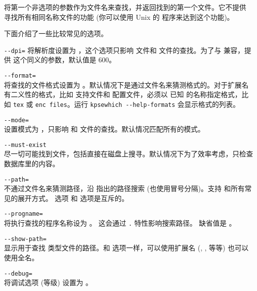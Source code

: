 \documentclass{article}
\begin{document}
\KPS{} 将第一个非选项的参数作为文件名来查找，并返回找到的第一个文件。它不提供
寻找所有相同名称文件的功能 (你可以使用 Unix 的  程序来达到这个功能)。

下面介绍了一些比较常见的选项。

\begin{ttdescription}
\item[\texttt{-{}-dpi=\var{num}}]\mbox{}
  将解析度设置为 ，这个选项只影响  文件和 
  文件的查找。为了与  兼容，提供 
  这个同义的参数，默认值是 600。

\item[\texttt{-{}-format=\var{name}}]\mbox{}\\
  将查找的文件格式设置为 。默认情况下是通过文件名来猜测格式的。对于扩展名
有二义性的格式，比如 \MP{} 支持文件和  配置文件，必须以 \KPS{} 已知
的名称指定格式，比如 \texttt{tex} 或 \texttt{enc files}。运行
  \texttt{kpsewhich -{}-help-formats} 会显示格式的列表。

\item[\texttt{-{}-mode=\var{string}}]\mbox{}\\
  设置模式为 ，只影响  和 
  文件的查找。默认情况匹配所有的模式。
\item[\texttt{-{}-must-exist}]\mbox{}\\
  尽一切可能找到文件，包括直接在磁盘上搜寻。默认情况下为了效率考虑，只检查
   数据库里的内容。
\item[\texttt{-{}-path=\var{string}}]\mbox{}\\
  不通过文件名来猜测路径，沿  指出的路径搜索
  (也使用冒号分隔)。支持 \samp{//} 和所有常见的展开方式。 选项
  和  选项是互斥的。
\item[\texttt{-{}-progname=\var{name}}]\mbox{}\\
  将执行查找的程序名称设为 \texttt{}。
  这会通过 \texttt{.} 特性影响搜索路径。
  缺省值是 。
\item[\texttt{-{}-show-path=\var{name}}]\mbox{}\\
  显示用于查找 \texttt{} 类型文件的路径。和 
  选项一样，可以使用扩展名 (, , 等等) 也可以使用全名。
\item[\texttt{-{}-debug=\var{num}}]\mbox{}\\
  将调试选项 (等级) 设置为 \texttt{}。
\end{ttdescription}
\end{document}
